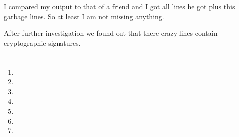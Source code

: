 \documentclass[12pt, a4paper]{article}
\begin{document}
\begin{enumerate}[a]
	I compared my output to that of a friend and I got all lines he got plus this garbage lines. So at least I am not missing anything.

	After further investigation we found out that there crazy lines contain cryptographic signatures.
\end{enumerate}

\section{} %

\section{} %
\begin{enumerate}[a]
	\item %
	\item %
	\item %
	\item %
	\item %
	\item %
	\item %
\end{enumerate}

\section{} %

\section{} %
\end{document}
